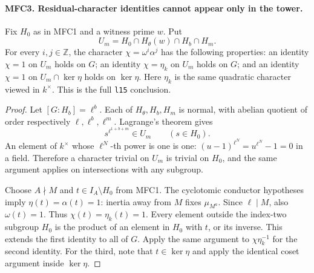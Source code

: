 \documentclass[11pt,a4paper]{article}
\numberwithin{equation}{section}
\theoremstyle{remark}\newtheorem{remark}[theorem]{Remark}
\begin{document}
\paragraph{MFC3. Residual-character identities cannot appear only in the tower.}
\label{claim:MFC3}
Fix \(H_0\) as in MFC1 and a witness prime \(w\).  Put
\[
 U_m=H_0\cap H_\theta(w)\cap H_b\cap H_m.                 \tag{MFC.10}
\]
For every \(i,j\in\mathbb Z\), the character
\(\chi=\omega^i\alpha^j\) has the following properties:
an identity \(\chi=1\) on \(U_m\) holds on \(G\);
an identity \(\chi=\eta_k\) on \(U_m\) holds on \(G\);
and an identity \(\chi=1\) on \(U_m\cap\ker\eta\) holds
on \(\ker\eta\).  Here \(\eta_k\) is the same quadratic
character viewed in \(k^\times\).  This is the full
\texttt{l15} conclusion.

\begin{proof}
Let \([G:H_b]=\ell^b\).  Each of \(H_\theta,H_b,H_m\)
is normal, with abelian quotient of order respectively
\(\ell,\ell^b,\ell^m\).  Lagrange's theorem gives
\[
 s^{\ell^{1+b+m}}\in U_m\qquad(s\in H_0).                 \tag{MFC.11}
\]
An element of \(k^\times\) whose \(\ell^N\)-th power is one
is one: \((u-1)^{\ell^N}=u^{\ell^N}-1=0\) in a field.
Therefore a character trivial on \(U_m\) is trivial on
\(H_0\), and the same argument applies on intersections with
any subgroup.

Choose \(A\nmid M\) and \(t\in I_A\setminus H_0\) from
MFC1.  The cyclotomic conductor hypotheses imply
\(\eta(t)=\alpha(t)=1\): inertia away from \(M\) fixes
\(\mu_{M^a}\).  Since \(\ell\mid M\), also
\(\omega(t)=1\).  Thus \(\chi(t)=\eta_k(t)=1\).
Every element outside the index-two subgroup \(H_0\) is the
product of an element in \(H_0\) with \(t\), or its inverse.
This extends the first identity to all of \(G\).  Apply the
same argument to \(\chi\eta_k^{-1}\) for the second identity.
For the third, note that \(t\in\ker\eta\) and apply the
identical coset argument inside \(\ker\eta\).
\end{proof}

\end{document}
